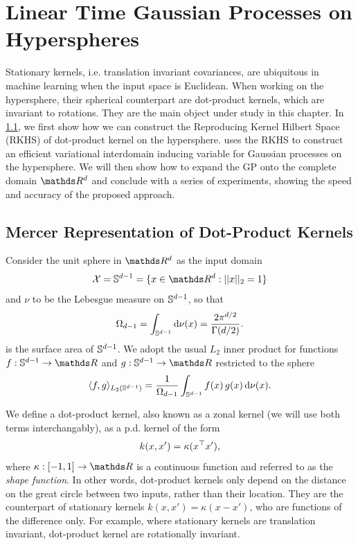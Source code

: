 \ifpdf
    \graphicspath{{Chapter3/Figs/Vector/}{Chapter3/Figs/PDF/}{Chapter3/Figs/}}
\else
    \graphicspath{{Chapter3/Figs/Raster/}{Chapter3/Figs/}}
\fi


\chapter{Linear Time Gaussian Processes on Hyperspheres}
\label{chapter:vish}

Stationary kernels, i.e. translation invariant covariances, are ubiquitous in machine learning when the input space is Euclidean. When working on the hypersphere, their spherical counterpart are dot-product kernels, which are invariant to rotations. They are the main object under study in this chapter. In \cref{sec:rkhs-dotproduct-kernels}, we first show how we can construct the Reproducing Kernel Hilbert Space (RKHS) of dot-product kernel on the hypersphere.  uses the RKHS to construct an efficient variational interdomain inducing variable for Gaussian processes on the hypersphere. We will then show how to expand the GP onto the complete domain $\Reals^d$ and conclude with a series of experiments, showing the speed and accuracy of the proposed approach.

\section{Mercer Representation of Dot-Product Kernels}
\label{sec:rkhs-dotproduct-kernels}

Consider the unit sphere in $\Reals^d$  as the input domain
\begin{equation}
    \mathcal{X} = \dsphere = \{x \in \Reals^d: \norm{x}_2 = 1\}
\end{equation}
and $\nu$ to be the Lebesgue measure on $\mathbb{S}^{d-1}$, so that
\begin{equation}
    \Omega_{d-1} = \int_{\mathbb{S}^{d-1}} \mathrm{d}{\nu(x)} = \frac{2 \pi ^ {d/2}}{\Gamma(d/2)}.
\end{equation}
is the surface area of $\mathbb{S}^{d-1}$. We adopt the usual $L_2$ inner product for functions $f: \dsphere \rightarrow \Reals$ and $g: \dsphere \rightarrow \Reals$ restricted to the sphere 
\begin{equation}
     \langle f, g\rangle_{L_{2}(\mathbb{S}^{d-1})} = \frac{1}{\Omega_{d-1}} \int_{\mathbb{S}^{d-1}} f(x)\,g(x) \, \mathrm{d}{\nu(x)}.
\end{equation}

We define a dot-product kernel, also known as a zonal kernel (we will use both terms interchangably), as a p.d. kernel of the form
\begin{equation}
    k(x, x') = \kappa(x^{\top} x'),
\end{equation}
where $\kappa: [-1, 1] \rightarrow \Reals$ is a continuous function and referred to as the \emph{shape function}. In other words, dot-product kernels only depend on the distance on the great circle between two inputs, rather than their location. They are the counterpart of stationary kernels $k(x, x') = \kappa(x - x')$, who are functions of the difference only. For example, where stationary kernels are translation invariant, dot-product kernel are rotationally invariant.

